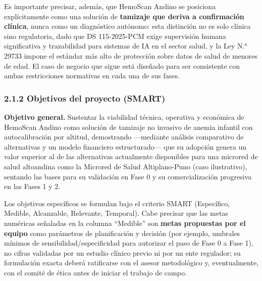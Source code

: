 \documentclass[11pt,a4paper]{article}
\begin{document}
Es importante precisar, además, que HemoScan Andino se posiciona explícitamente como una solución de \textbf{tamizaje que deriva a confirmación clínica}, nunca como un diagnóstico autónomo: esta distinción no es solo clínica sino regulatoria, dado que DS 115-2025-PCM exige supervisión humana significativa y trazabilidad para sistemas de IA en el sector salud, y la Ley N.° 29733 impone el estándar más alto de protección sobre datos de salud de menores de edad. El caso de negocio que sigue está diseñado para ser consistente con ambas restricciones normativas en cada una de sus fases.

\subsubsection{2.1.2 Objetivos del proyecto (SMART)}\label{objetivos-del-proyecto-smart}

\textbf{Objetivo general.} Sustentar la viabilidad técnica, operativa y económica de HemoScan Andino como solución de tamizaje no invasivo de anemia infantil con autocalibración por altitud, demostrando ---mediante análisis comparativo de alternativas y un modelo financiero estructurado--- que su adopción genera un valor superior al de las alternativas actualmente disponibles para una microred de salud altoandina como la Microred de Salud Altiplano-Puno (caso ilustrativo), sentando las bases para su validación en Fase 0 y su comercialización progresiva en las Fases 1 y 2.

Los objetivos específicos se formulan bajo el criterio SMART (Específico, Medible, Alcanzable, Relevante, Temporal). Cabe precisar que las metas numéricas señaladas en la columna ``Medible'' son \textbf{metas propuestas por el equipo} como parámetros de planificación y decisión (por ejemplo, umbrales mínimos de sensibilidad/especificidad para autorizar el paso de Fase 0 a Fase 1), no cifras validadas por un estudio clínico previo ni por un ente regulador; su formulación exacta deberá ratificarse con el asesor metodológico y, eventualmente, con el comité de ética antes de iniciar el trabajo de campo.
\end{document}
